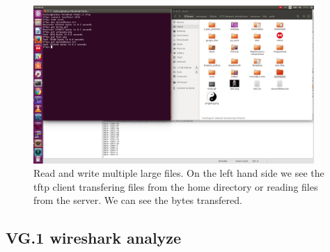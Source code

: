 \documentclass[a4paper,12pt]{article}
\numberwithin{figure}{section}
\begin{document}
\begin{figure}[h!]
	\centering
	\includegraphics[width=0.95\textwidth,keepaspectratio]{img/ReadWriteMultipleFiles.png} 
	\caption{Read and write multiple large files. On the left hand side we see the tftp client transfering files from the home directory or reading files from the server. We can see the bytes transfered.}
	\label{TFTP_READ_WRITE}
\end{figure}

\newpage
\subsection{VG.1 wireshark analyze}
\end{document}
